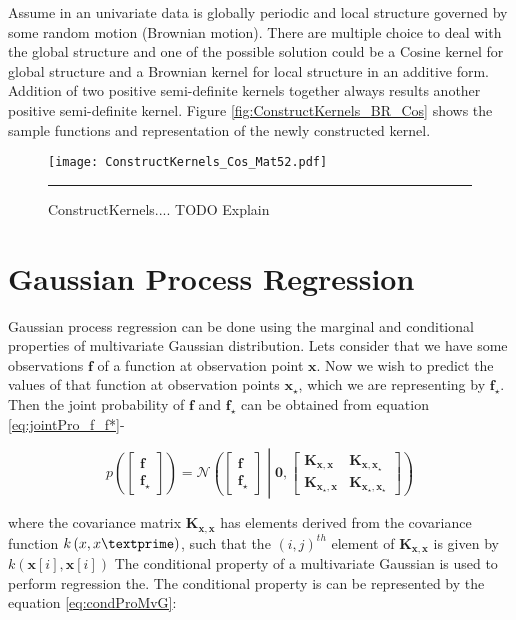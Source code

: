 Assume in an univariate data is globally periodic and local structure governed by some random motion (Brownian motion). There are multiple choice to deal with the global structure and one of the possible solution could be a Cosine kernel for global structure and a Brownian kernel for local structure in an additive form. Addition of two positive semi-definite kernels together always results another positive semi-definite kernel. Figure \ref{fig:ConstructKernels_BR_Cos} shows the sample functions and representation of the newly constructed kernel.

\begin{figure}[t]
	\centering
		\texttt{[image: ConstructKernels\_Cos\_Mat52.pdf]}
		\rule{35em}{0.5pt}
	\caption[ConstructKernels.png ]
		{ConstructKernels.... TODO Explain} %
	\label{fig:ConstructKernels}
\end{figure}

\section{Gaussian Process Regression}
Gaussian process regression can be done using the marginal and conditional properties of multivariate Gaussian distribution. Lets consider that we have some observations $\mathbf{f}$ of a function at observation point $\mathbf{x}$. Now we wish to predict the values of that function at observation points $\mathbf{x_\star}$, which we are representing by $\mathbf{f_\star}$. Then the joint probability of $\mathbf{f}$ and $\mathbf{f_\star}$ can be obtained from equation \ref{eq:jointPro_f_f*}-

\begin{equation} \label{eq:jointPro_f_f*}
p \left( \begin{bmatrix} \mathbf{f} \\\mathbf{f_\star} \end{bmatrix} \right) =
\mathcal{N}\left( \begin{bmatrix} \mathbf{f} \\\mathbf{f_\star} \end{bmatrix} \middle|
\mathbf{0}, \begin{bmatrix} \mathbf{K_{x,x}} & \mathbf{K_{x,x_\star}} \\
			    \mathbf{K_{x_\star,x}} & \mathbf{K_{x_\star,x_\star}} \end{bmatrix} \right)
\end{equation}

where the covariance matrix $ \mathbf{K_{x,x}}$ has elements derived from the covariance function $ k \left(x,x\textprime \right)$, such that the $ \left(i,j \right)^{th}$ element of $ \mathbf{K_{x,x}}$ is
given by $k \left( \mathbf{x} \left[ i\right],\mathbf{x} \left[ i\right] \right) $ The conditional property of a multivariate Gaussian is used to perform regression the. The conditional property is can be represented by the equation \ref{eq:condProMvG}: 

